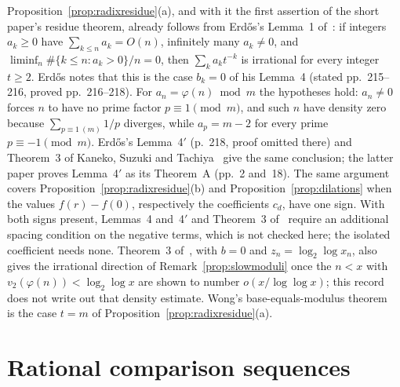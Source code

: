 \begin{rem}
\label{rem:erdos1957}
Proposition~\ref{prop:radixresidue}(a), and with it the first assertion
of the short paper's residue theorem, already follows from Erd\H{o}s's
Lemma~1 of~\cite[p.~213]{erdos1957}: if integers $a_k\ge0$ have
$\sum_{k\le n}a_k=O(n)$, infinitely many $a_k\ne0$, and
$\liminf_n\#\{k\le n:a_k>0\}/n=0$, then $\sum_ka_kt^{-k}$ is irrational for
every integer $t\ge2$. Erd\H{o}s notes that this is the case $b_k=0$ of his
Lemma~4 (stated pp.~215--216, proved pp.~216--218). For
$a_n=\varphi(n)\bmod m$ the hypotheses hold: $a_n\ne0$ forces $n$ to have
no prime factor $p\equiv1\pmod m$, and such $n$ have density zero because
$\sum_{p\equiv1\ (m)}1/p$ diverges, while $a_p=m-2$ for every prime
$p\equiv-1\pmod m$. Erd\H{o}s's Lemma~4$'$ (p.~218, proof omitted there)
and Theorem~3 of Kaneko, Suzuki and Tachiya~\cite[p.~5]{kst2026} give the
same conclusion; the latter paper proves Lemma~4$'$ as its Theorem~A
(pp.~2 and~18). The same argument covers
Proposition~\ref{prop:radixresidue}(b) and Proposition~\ref{prop:dilations}
when the values $f(r)-f(0)$, respectively the coefficients $c_d$, have one
sign. With both signs present, Lemmas~4 and~4$'$ and Theorem~3
of~\cite{kst2026} require an additional spacing condition on the negative
terms, which is not checked here; the isolated coefficient needs none.
Theorem~3 of~\cite{kst2026}, with $b=0$ and $z_n=\log_2\log x_n$, also
gives the irrational direction of Remark~\ref{prop:slowmoduli} once
the $n<x$ with $v_2(\varphi(n))<\log_2\log x$ are shown to number
$o(x/\log\log x)$; this record does not write out that density estimate.
Wong's base-equals-modulus theorem~\cite{wong2015} is the case $t=m$ of
Proposition~\ref{prop:radixresidue}(a).
\end{rem}

\section{Rational comparison sequences}
\label{sec:wall}

